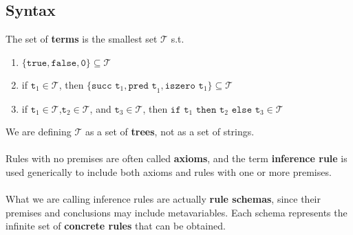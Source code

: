 \documentclass{article}
\begin{document}
\subsection{Syntax}
The set of \textbf{terms} is the smallest set \(\mathcal{T}\) s.t.
\begin{enumerate}
\item\(\{\texttt{true},\texttt{false},\texttt{0}\}\subseteq\mathcal{T}\)
\item if \(\texttt{t}_{1}\in\mathcal{T}\), then \(\{\texttt{succ t}_{1},\texttt{pred t}_{1},\texttt{iszero t}_{1}\}\subseteq\mathcal{T}\)
\item if \(\texttt{t}_{1}\in\mathcal{T}\),\(\texttt{t}_{2}\in\mathcal{T}\), and \(\texttt{t}_{3}\in\mathcal{T}\), then \(\texttt{if t}_{1}\texttt{ then t}_{2}\texttt{ else t}_{3}\in\mathcal{T}\)
\end{enumerate}
We are defining \(\mathcal{T}\) as a set of \textbf{trees}, not as a set of strings.\\\\
Rules with no premises are often called \textbf{axioms}, and the term \textbf{inference rule} is used generically to include both axioms and rules with one or more premises.\\\\
What we are calling inference rules are actually \textbf{rule schemas}, since their premises and conclusions may include metavariables.
Each schema represents the infinite set of \textbf{concrete rules} that can be obtained.\\\\
\end{document}

